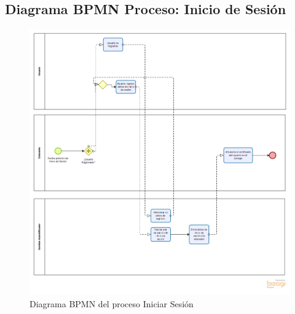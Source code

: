 \documentclass[12pt, a4paper, titlepage]{report}
\begin{document}
    	    \subsection{Diagrama BPMN Proceso: Inicio de Sesión}
        	    \begin{figure}[H]
                		\begin{center}
                		\includegraphics[width=12cm]{./imagenes/Analisis/BPMN_IS.png}
                		\caption{Diagrama BPMN del proceso Iniciar Sesión}
        	            \end{center}
        	    \end{figure}   
    	        
\end{document}
